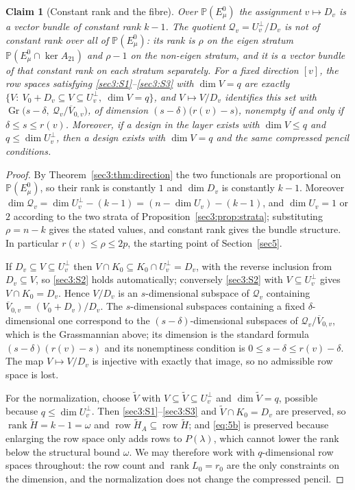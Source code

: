 \documentclass[journal]{IEEEtran}
\theoremstyle{plainn}
\newtheorem{claim}{Claim}
\theoremstyle{remark}
\newcommand{\row}{\operatorname{row}}
\newcommand{\rank}{\operatorname{rank}}
\newcommand{\Gr}{\operatorname{Gr}}
\begin{document}
\begin{claim}[Constant rank and the fibre]
\label{sec3:lem:constantrank}
\label{sec3:lem:fibre}
\label{sec3:lem:fullrank}
Over $\mathbb{P}(E_\mu^0)$ the assignment $v\mapsto D_v$ is a vector bundle of constant rank $k-1$. The
quotient $\mathcal{Q}_v=U_v^\perp/D_v$ is \emph{not} of constant rank over all of $\mathbb{P}(E_\mu^0)$:
its rank is $\rho$ on the eigen stratum $\mathbb{P}(E_\mu^0\cap\ker A_{21})$ and $\rho-1$ on the
non-eigen stratum, and it is a vector bundle of that constant rank on each stratum separately. For a
fixed direction
$[v]$, the row spaces satisfying \ref{sec3:S1}--\ref{sec3:S3} with $\dim V=q$ are exactly
$\{V:\ V_0+D_v\subseteq V\subseteq U_v^\perp,\ \dim V=q\}$, and $V\mapsto V/D_v$ identifies this set
with $\Gr\bigl(s-\delta,\ \mathcal{Q}_v/\overline{V}_{0,v}\bigr)$, of dimension
$(s-\delta)\bigl(r(v)-s\bigr)$, nonempty if and only if $\delta\le s\le r(v)$. Moreover, if a design
in the layer exists with $\dim V\le q$ and $q\le\dim U_v^\perp$, then a design exists with $\dim V=q$
and the same compressed pencil conditions.
\end{claim}
\begin{proof}
By Theorem~\ref{sec3:thm:direction} the two functionals are proportional on $\mathbb{P}(E_\mu^0)$, so
their rank is constantly $1$ and $\dim D_v$ is constantly $k-1$. Moreover
$\dim\mathcal{Q}_v=\dim U_v^\perp-(k-1)=(n-\dim U_v)-(k-1)$, and $\dim U_v=1$ or $2$ according to the
two strata of Proposition~\ref{sec3:prop:strata}; substituting $\rho=n-k$ gives the stated values, and
constant rank gives the bundle structure. In particular $r(v)\le\rho\le2p$, the starting point of
Section~\ref{sec5}.

If $D_v\subseteq V\subseteq U_v^\perp$ then $V\cap K_0\subseteq K_0\cap U_v^\perp=D_v$, with the
reverse inclusion from $D_v\subseteq V$, so \ref{sec3:S2} holds automatically; conversely
\ref{sec3:S2} with $V\subseteq U_v^\perp$ gives $V\cap K_0=D_v$. Hence $V/D_v$ is an $s$-dimensional
subspace of $\mathcal{Q}_v$ containing $\overline{V}_{0,v}=(V_0+D_v)/D_v$. The $s$-dimensional
subspaces containing a fixed $\delta$-dimensional one correspond to the $(s-\delta)$-dimensional
subspaces of $\mathcal{Q}_v/\overline{V}_{0,v}$, which is the Grassmannian above; its dimension is the
standard formula $(s-\delta)(r(v)-s)$ and its nonemptiness condition is $0\le s-\delta\le r(v)-\delta$.
The map $V\mapsto V/D_v$ is injective with exactly that image, so no admissible row space is lost.

For the normalization, choose $\tilde V$ with $V\subseteq\tilde V\subseteq U_v^\perp$ and
$\dim\tilde V=q$, possible because $q\le\dim U_v^\perp$. Then \ref{sec3:S1}--\ref{sec3:S3} and
$\tilde V\cap K_0=D_v$ are preserved, so $\rank\tilde H=k-1=\omega$ and
$\row\tilde H_A\subseteq\row\tilde H$; and \eqref{eq:5b} is preserved because enlarging the row space
only adds rows to $P(\lambda)$, which cannot lower the rank below the structural bound $\omega$. We may
therefore work with $q$-dimensional row spaces throughout: the row count and $\rank L_0=r_0$ are the
only constraints on the dimension, and the normalization does not change the compressed pencil.
\end{proof}
\end{document}
